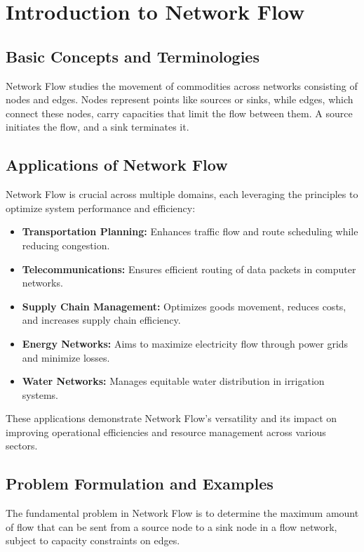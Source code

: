 \documentclass[12pt]{book} %
\begin{document}
\section{Introduction to Network Flow}

\subsection{Basic Concepts and Terminologies}
Network Flow studies the movement of commodities across networks consisting of nodes and edges. Nodes represent points like sources or sinks, while edges, which connect these nodes, carry capacities that limit the flow between them. A source initiates the flow, and a sink terminates it.

\subsection{Applications of Network Flow}
Network Flow is crucial across multiple domains, each leveraging the principles to optimize system performance and efficiency:

\begin{itemize}
    \item \textbf{Transportation Planning:} Enhances traffic flow and route scheduling while reducing congestion.
    \item \textbf{Telecommunications:} Ensures efficient routing of data packets in computer networks.
    \item \textbf{Supply Chain Management:} Optimizes goods movement, reduces costs, and increases supply chain efficiency.
    \item \textbf{Energy Networks:} Aims to maximize electricity flow through power grids and minimize losses.
    \item \textbf{Water Networks:} Manages equitable water distribution in irrigation systems.
\end{itemize}

These applications demonstrate Network Flow's versatility and its impact on improving operational efficiencies and resource management across various sectors.


\subsection{Problem Formulation and Examples}
The fundamental problem in Network Flow is to determine the maximum amount of flow that can be sent from a source node to a sink node in a flow network, subject to capacity constraints on edges.
\end{document}

